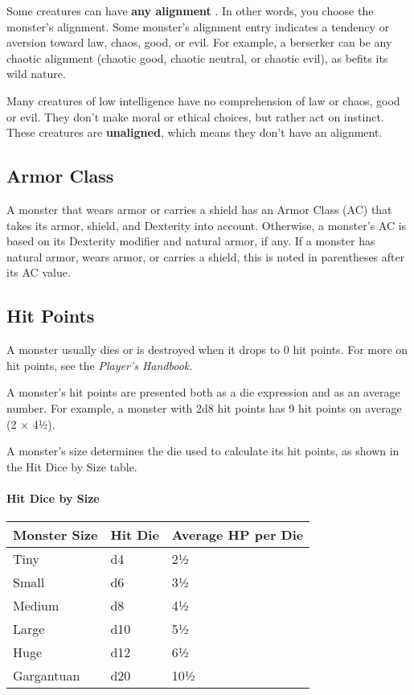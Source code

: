 \documentclass[
]{article}
\begin{document}
Some creatures can have \textbf{any alignment} . In other words, you
choose the monster's alignment. Some monster's alignment entry indicates
a tendency or aversion toward law, chaos, good, or evil. For example, a
berserker can be any chaotic alignment (chaotic good, chaotic neutral,
or chaotic evil), as befits its wild nature.

Many creatures of low intelligence have no comprehension of law or
chaos, good or evil. They don't make moral or ethical choices, but
rather act on instinct. These creatures are \textbf{unaligned}, which
means they don't have an alignment.

\hypertarget{armor-class}{%
\subsection{Armor Class}\label{armor-class}}

A monster that wears armor or carries a shield has an Armor Class (AC)
that takes its armor, shield, and Dexterity into account. Otherwise, a
monster's AC is based on its Dexterity modifier and natural armor, if
any. If a monster has natural armor, wears armor, or carries a shield,
this is noted in parentheses after its AC value.

\hypertarget{hit-points}{%
\subsection{Hit Points}\label{hit-points}}

A monster usually dies or is destroyed when it drops to 0 hit points.
For more on hit points, see the \emph{Player's Handbook.}

A monster's hit points are presented both as a die expression and as an
average number. For example, a monster with 2d8 hit points has 9 hit
points on average (2 × 4½).

A monster's size determines the die used to calculate its hit points, as
shown in the Hit Dice by Size table.

\hypertarget{hit-dice-by-size}{%
\paragraph{Hit Dice by Size}\label{hit-dice-by-size}}

\begin{longtable}[]{@{}lll@{}}
\toprule
Monster Size & Hit Die & Average HP per Die\tabularnewline
\midrule
\endhead
Tiny & d4 & 2½\tabularnewline
Small & d6 & 3½\tabularnewline
Medium & d8 & 4½\tabularnewline
Large & d10 & 5½\tabularnewline
Huge & d12 & 6½\tabularnewline
Gargantuan & d20 & 10½\tabularnewline
\bottomrule
\end{longtable}
\end{document}
